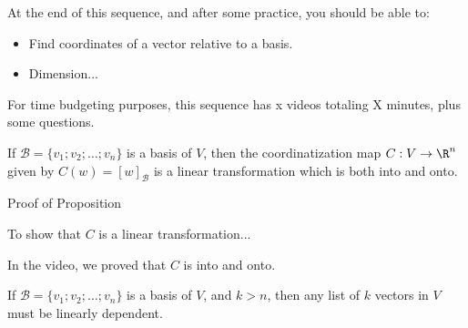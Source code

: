 







At the end of this sequence, and after some practice, you should be able to:

\begin{itemize} 
\item Find coordinates of a vector relative to a basis.  
\item Dimension... 
\end{itemize}


For time budgeting purposes, this sequence has x videos totaling X minutes, 
plus some questions.  




\endedxtext

\endedxvertical














{}  If $\mathcal{B}  = \{v_1; v_2; \ldots ; v_n\}$ is a basis of $V$, then the
coordinatization map $C: V \rightarrow \R^n$ given by $C(w) = [w]_{\mathcal{B}}$ is a linear transformation
which is both into and onto.

\begin{edXshowhide}{Proof of Proposition}

To show that $C$ is a linear transformation...

In the video, we proved that $C$ is into and onto. 

\end{edXshowhide}



{}  If $\mathcal{B}  = \{v_1; v_2; \ldots ; v_n\}$ is a basis of $V$, and $k>n$, then any list
of $k$ vectors in $V$ must be linearly dependent.  

\endedxtext


\endedxvertical






